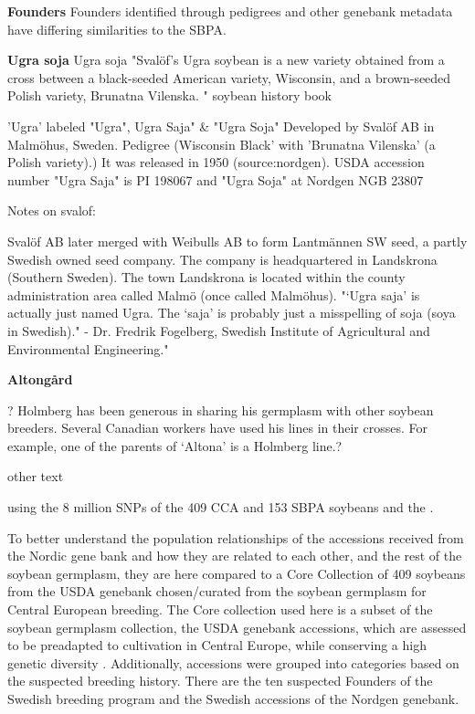 \documentclass[9pt, onecolumn,twoside]{gsajnl}
\begin{document}
\textbf{Founders}
Founders identified through pedigrees and other genebank metadata have differing similarities to the SBPA. 


\textbf{Ugra soja}
Ugra soja 
"Svalöf’s Ugra soybean is a new variety obtained from a cross between a black-seeded American variety, Wisconsin, and a brown-seeded Polish variety, Brunatna Vilenska. " soybean history book

'Ugra' 
labeled "Ugra", Ugra Saja" & "Ugra Soja"
Developed by Svalöf AB in Malmöhus, Sweden.
Pedigree (Wisconsin Black' with 'Brunatna Vilenska' (a Polish variety).)  It was released in 1950 (source:nordgen).  USDA accession number "Ugra Saja"  is PI 198067 and "Ugra Soja"  at Nordgen NGB 23807

Notes on svalof:

    Svalöf AB later merged with Weibulls AB to form Lantmännen SW seed, a partly Swedish owned seed company. The company is headquartered in Landskrona (Southern Sweden). The town Landskrona is located within the county administration area called Malmö (once called Malmöhus).
    "‘Ugra saja’ is actually just named Ugra. The ‘saja’ is probably just a misspelling of soja (soya in Swedish)." - Dr. Fredrik Fogelberg, Swedish Institute of Agricultural and Environmental Engineering."


\textbf{Altongård}

? Holmberg has been generous in sharing his germplasm with other soybean breeders. Several Canadian workers have used his lines in their crosses. For example, one of the parents of ‘Altona’ is a Holmberg line.?


other text

using the 8 million SNPs of the 409 CCA and 153 SBPA soybeans and the . 

To better understand the population relationships of the accessions received from the Nordic gene bank and how they are related to each other, and the rest of the soybean germplasm, they are here compared to a Core Collection of 409 soybeans from the USDA genebank chosen/curated from the soybean germplasm for Central European breeding.  The Core collection used here is a subset of the soybean germplasm collection, the  USDA genebank accessions, which are assessed to be  preadapted to cultivation in Central Europe, while conserving a high genetic diversity \cite{haupt20}. Additionally, accessions were grouped into categories based on the suspected breeding history.  There are the ten suspected Founders of the Swedish breeding program and the Swedish accessions of the Nordgen genebank. 
\end{document}
